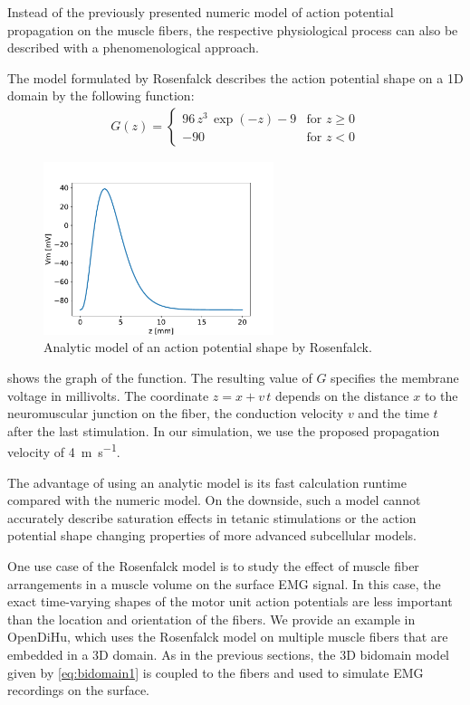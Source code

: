 Instead of the previously presented numeric model of action potential propagation on the muscle fibers, the respective physiological process can also be described with a phenomenological approach.

The model formulated by Rosenfalck \cite{Rosenfalck1969} describes the action potential shape on a 1D domain by the following function:
%
\begin{align*}
  G(z) = \begin{cases}
    96\,z^3\,\exp(-z) - 9 & \text{for } z \geq 0\\[4mm]
    -90  & \text{for } z < 0
  \end{cases}  
\end{align*}

\begin{figure}
  \centering%
  \includegraphics[width=0.6\textwidth]{images/results/application/rosenfalck_function.pdf}%
  \caption{Analytic model of an action potential shape by Rosenfalck.}%
  \label{fig:rosenfalck_function}%
\end{figure}
 shows the graph of the function. The resulting value of $G$ specifies the membrane voltage in millivolts. The coordinate $z=x+v\,t$ depends on the distance $x$ to the neuromuscular junction on the fiber, the conduction velocity $v$ and the time $t$ after the last stimulation. In our simulation, we use the proposed propagation velocity of \SI{4}{\meter\per\second}.

The advantage of using an analytic model is its fast calculation runtime compared with the numeric model. On the downside, such a model cannot accurately describe saturation effects in tetanic stimulations or the action potential shape changing properties of more advanced subcellular models.

One use case of the Rosenfalck model is to study the effect of muscle fiber arrangements in a muscle volume on the surface EMG signal. In this case, the exact time-varying shapes of the motor unit action potentials are less important than the location and orientation of the fibers.
We provide an example in OpenDiHu, which uses the Rosenfalck model on multiple muscle fibers that are embedded in a 3D domain. As in the previous sections, the 3D bidomain model given by \cref{eq:bidomain1} is coupled to the fibers and used to simulate EMG recordings on the surface. 

